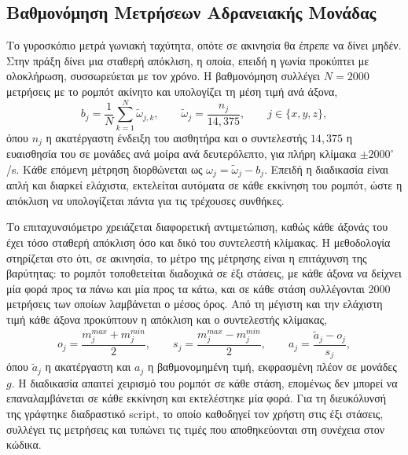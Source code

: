 \documentclass[11pt]{report}
\begin{document}
\subsection{Βαθμονόμηση Μετρήσεων Αδρανειακής Μονάδας}
\label{subsec:imu-calibration}
Το γυροσκόπιο μετρά γωνιακή ταχύτητα, οπότε σε ακινησία θα έπρεπε να δίνει
μηδέν. Στην πράξη δίνει μια σταθερή απόκλιση, η οποία, επειδή η γωνία προκύπτει
με ολοκλήρωση, συσσωρεύεται με τον χρόνο. Η βαθμονόμηση συλλέγει $N = 2000$
μετρήσεις με το ρομπότ ακίνητο και υπολογίζει τη μέση τιμή ανά άξονα,
\begin{equation}
b_j = \frac{1}{N} \sum_{k=1}^{N} \tilde{\omega}_{j,k}, \qquad
\tilde{\omega}_j = \frac{n_j}{14{,}375}, \qquad j \in \{x, y, z\},
\label{eq:gyro-bias}
\end{equation}
όπου $n_j$ η ακατέργαστη ένδειξη του αισθητήρα και ο συντελεστής $14{,}375$ η
ευαισθησία του σε μονάδες ανά μοίρα ανά δευτερόλεπτο, για πλήρη κλίμακα
$\pm 2000^\circ$/s. Κάθε επόμενη μέτρηση διορθώνεται ως
$\omega_j = \tilde{\omega}_j - b_j$. Επειδή η διαδικασία είναι απλή και διαρκεί
ελάχιστα, εκτελείται αυτόματα σε κάθε εκκίνηση του ρομπότ, ώστε η απόκλιση να
υπολογίζεται πάντα για τις τρέχουσες συνθήκες.

Το επιταχυνσιόμετρο χρειάζεται διαφορετική αντιμετώπιση, καθώς κάθε άξονάς του
έχει τόσο σταθερή απόκλιση όσο και δικό του συντελεστή κλίμακας. Η μεθοδολογία
στηρίζεται στο ότι, σε ακινησία, το μέτρο της μέτρησης είναι η επιτάχυνση της
βαρύτητας: το ρομπότ τοποθετείται διαδοχικά σε έξι στάσεις, με κάθε άξονα να
δείχνει μία φορά προς τα πάνω και μία προς τα κάτω, και σε κάθε στάση
συλλέγονται 2000 μετρήσεις των οποίων λαμβάνεται ο μέσος όρος. Από τη μέγιστη
και την ελάχιστη τιμή κάθε άξονα προκύπτουν η απόκλιση και ο συντελεστής
κλίμακας,
\begin{equation}
o_j = \frac{m_j^{max} + m_j^{min}}{2}, \qquad
s_j = \frac{m_j^{max} - m_j^{min}}{2}, \qquad
a_j = \frac{\tilde{a}_j - o_j}{s_j},
\label{eq:accel-calib}
\end{equation}
όπου $\tilde{a}_j$ η ακατέργαστη και $a_j$ η βαθμονομημένη τιμή, εκφρασμένη
πλέον σε μονάδες $g$. Η διαδικασία απαιτεί χειρισμό του ρομπότ σε κάθε στάση,
επομένως δεν μπορεί να επαναλαμβάνεται σε κάθε εκκίνηση και εκτελέστηκε μία
φορά. Για τη διευκόλυνσή της γράφτηκε διαδραστικό script, το οποίο καθοδηγεί
τον χρήστη στις έξι στάσεις, συλλέγει τις μετρήσεις και τυπώνει τις τιμές που
αποθηκεύονται στη συνέχεια στον κώδικα.
\end{document}
